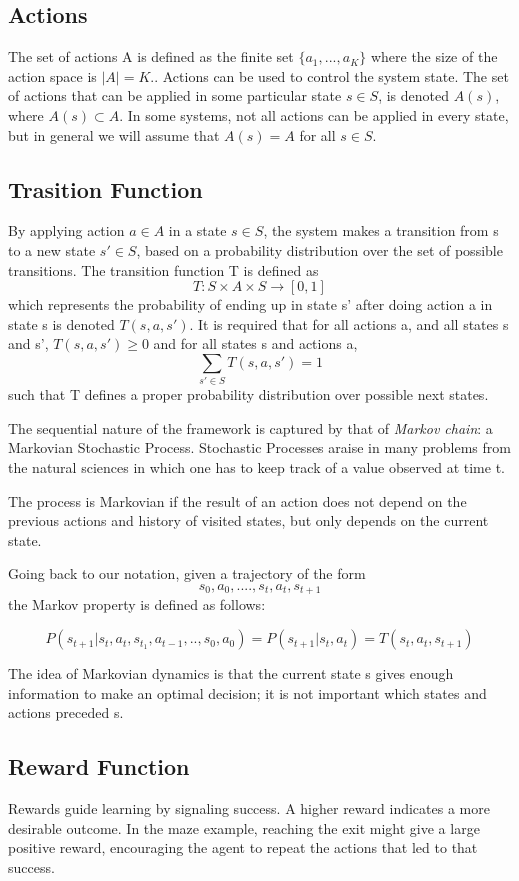 \documentclass[a4paper,11pt]{report}
\theoremstyle{definition}
\theoremstyle{plain}
\begin{document}
\subsection*{Actions}
The set of actions A is defined as the finite set $\{a_1 , . . . , a_K \}$ where the size of the
action space is $|A| = K.$. Actions can be used to control the system state.
The set of actions that can be applied in some particular state $s \in S$, is denoted $A(s)$,
where $A(s) \subset A$. In some systems, not all actions can be applied in every state, but in
general we will assume that $A(s) = A$ for all $s \in S$.

\subsection*{Trasition Function}
By applying action $a \in A$ in a state $s \in S$, the system makes a transition from s to a
new state $s' \in S$, based on a probability distribution over the set of possible transitions. 
The transition function T is defined as 
$$T : S \times A \times S \rightarrow [0,1]$$ which represents the probability
of ending up in state s' after doing action a in state s is denoted $ T(s,a,s')$. It is required that 
for all actions a, and all states s and s', $T (s,a,s') \geq 0$ and for all states s and actions a, 
$$\sum_{s' \in S} T (s,a,s') = 1$$
such that T defines a proper probability distribution over possible next states. \

The sequential nature of the framework is captured by that of \textit{Markov chain}:
a Markovian Stochastic Process. 
Stochastic Processes araise in many problems from the natural sciences
in which one has to keep track of a value observed at time t. 

The process is Markovian if the result of an action does not
depend on the previous actions and history of visited states, but only depends on the
current state.

Going back to our notation, given a trajectory of the form 
$$s_0, a_0, . . . . , s_t, a_t, s_{t+1}$$
the Markov property is defined as follows:

$$P(s_{t+1} | s_t ,a_t ,s_{t_1} ,a_{t-1} , . . ,s_0,a_0) = P(s_{t+1} | s_t ,a_t ) = T (s_t ,a_t ,s_{t+1} )$$

The idea of Markovian dynamics is that the current state s gives enough information
to make an optimal decision; it is not important which states and actions preceded s.

\subsection*{Reward Function}
Rewards guide learning by signaling success. A higher reward indicates a more 
desirable outcome. In the maze example, reaching the exit might give a large positive 
reward, encouraging the agent to repeat the actions that led to that success.
\end{document}
